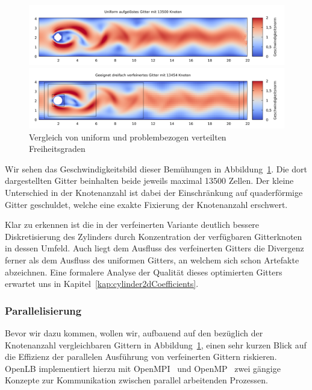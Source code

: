 \begin{figure}[H]
\begin{adjustbox}{center}
\includegraphics[width=1.2\textwidth]{img/static/cylinder2d_unrefined_n12_re100_16s.pdf}
\end{adjustbox}
\begin{adjustbox}{center}
\includegraphics[width=1.2\textwidth]{img/static/cylinder2d_optimized_refinement_n5_re100_16s.pdf}
\end{adjustbox}
\caption{Vergleich von uniform und problembezogen verteilten Freiheitsgraden}
\label{fig:CylinderOptimizedGridComparison}
\end{figure}

\newpage
Wir sehen das Geschwindigkeitsbild dieser Bemühungen in Abbildung~\ref{fig:CylinderOptimizedGridComparison}. Die dort dargestellten Gitter beinhalten beide jeweils maximal 13500 Zellen. Der kleine Unterschied in der Knotenanzahl ist dabei der Einschränkung auf quaderförmige Gitter geschuldet, welche eine exakte Fixierung der Knotenanzahl erschwert.

Klar zu erkennen ist die in der verfeinerten Variante deutlich bessere Diskretisierung des Zylinders durch Konzentration der verfügbaren Gitterknoten in dessen Umfeld. Auch liegt dem Ausfluss des verfeinerten Gitters die Divergenz ferner als dem Ausfluss des uniformen Gitters, an welchem sich schon Artefakte abzeichnen. Eine formalere Analyse der Qualität dieses optimierten Gitters erwartet uns in Kapitel~\ref{kap:cylinder2dCoefficients}.

\subsubsection{Parallelisierung}

Bevor wir dazu kommen, wollen wir, aufbauend auf den bezüglich der Knotenanzahl vergleichbaren Gittern in Abbildung~\ref{fig:CylinderOptimizedGridComparison}, einen sehr kurzen Blick auf die Effizienz der parallelen Ausführung von verfeinerten Gittern riskieren. OpenLB implementiert hierzu mit OpenMPI~\cite{OpenMPI} und OpenMP~\cite{OpenMP} zwei gängige Konzepte zur Kommunikation zwischen parallel arbeitenden Prozessen.

